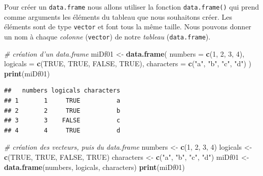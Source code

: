 \documentclass[
]{book}
\newenvironment{Shaded}{\begin{snugshade}}{\end{snugshade}}
\newcommand{\CommentTok}[1]{\textcolor[rgb]{0.56,0.35,0.01}{\textit{#1}}}
\newcommand{\DataTypeTok}[1]{\textcolor[rgb]{0.13,0.29,0.53}{#1}}
\newcommand{\DecValTok}[1]{\textcolor[rgb]{0.00,0.00,0.81}{#1}}
\newcommand{\KeywordTok}[1]{\textcolor[rgb]{0.13,0.29,0.53}{\textbf{#1}}}
\newcommand{\NormalTok}[1]{#1}
\newcommand{\OtherTok}[1]{\textcolor[rgb]{0.56,0.35,0.01}{#1}}
\newcommand{\StringTok}[1]{\textcolor[rgb]{0.31,0.60,0.02}{#1}}
\begin{document}
Pour créer un \texttt{data.frame} nous allons utiliser la fonction \texttt{data.frame()} qui prend comme arguments les éléments du tableau que nous souhaitons créer. Les éléments sont de type \texttt{vector} et font tous la même taille. Nous pouvons donner un nom à chaque \emph{colonne} (\texttt{vector}) de notre \emph{tableau} (\texttt{data.frame}).

\begin{Shaded}
\begin{Highlighting}[]
\CommentTok{# création d'un data.frame }
\NormalTok{miDf01 <-}\StringTok{ }\KeywordTok{data.frame}\NormalTok{(}
  \DataTypeTok{numbers =} \KeywordTok{c}\NormalTok{(}\DecValTok{1}\NormalTok{, }\DecValTok{2}\NormalTok{, }\DecValTok{3}\NormalTok{, }\DecValTok{4}\NormalTok{), }
  \DataTypeTok{logicals =} \KeywordTok{c}\NormalTok{(}\OtherTok{TRUE}\NormalTok{, }\OtherTok{TRUE}\NormalTok{, }\OtherTok{FALSE}\NormalTok{, }\OtherTok{TRUE}\NormalTok{), }
  \DataTypeTok{characters =} \KeywordTok{c}\NormalTok{(}\StringTok{"a"}\NormalTok{, }\StringTok{"b"}\NormalTok{, }\StringTok{"c"}\NormalTok{, }\StringTok{"d"}\NormalTok{)}
\NormalTok{)}
\KeywordTok{print}\NormalTok{(miDf01)}
\end{Highlighting}
\end{Shaded}

\begin{verbatim}
##   numbers logicals characters
## 1       1     TRUE          a
## 2       2     TRUE          b
## 3       3    FALSE          c
## 4       4     TRUE          d
\end{verbatim}

\begin{Shaded}
\begin{Highlighting}[]
\CommentTok{# création des vecteurs, puis du data.frame}
\NormalTok{numbers <-}\StringTok{ }\KeywordTok{c}\NormalTok{(}\DecValTok{1}\NormalTok{, }\DecValTok{2}\NormalTok{, }\DecValTok{3}\NormalTok{, }\DecValTok{4}\NormalTok{)}
\NormalTok{logicals <-}\StringTok{ }\KeywordTok{c}\NormalTok{(}\OtherTok{TRUE}\NormalTok{, }\OtherTok{TRUE}\NormalTok{, }\OtherTok{FALSE}\NormalTok{, }\OtherTok{TRUE}\NormalTok{)}
\NormalTok{characters <-}\StringTok{ }\KeywordTok{c}\NormalTok{(}\StringTok{"a"}\NormalTok{, }\StringTok{"b"}\NormalTok{, }\StringTok{"c"}\NormalTok{, }\StringTok{"d"}\NormalTok{)}
\NormalTok{miDf01 <-}\StringTok{ }\KeywordTok{data.frame}\NormalTok{(numbers, logicals, characters)}
\KeywordTok{print}\NormalTok{(miDf01)}
\end{Highlighting}
\end{Shaded}
\end{document}
